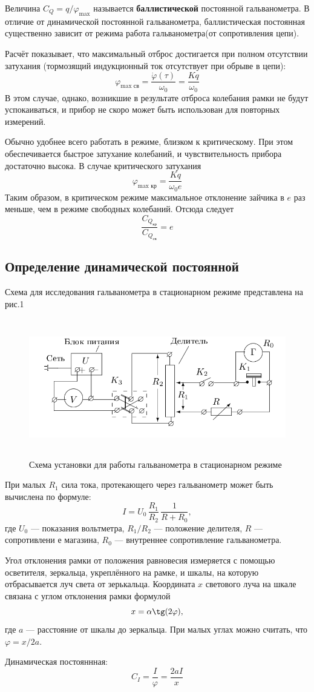 \documentclass[12pt]{article}
\begin{document}
\par
	Величина $C_Q = q / \varphi_\text{max}$ называется {\bf баллистической} постоянной гальванометра. В отличие от динамической постоянной гальванометра, баллистическая постоянная существенно зависит от режима работа гальванометра(от сопротивления цепи).
\par
	Расчёт показывает, что максимальный отброс достигается при полном отсутствии затухания (тормозящий индукционный ток отсутствует при обрыве в цепи):
\[
	\varphi_\text{max св} = \frac{\dot \varphi(\tau)}{\omega_0} = \frac{Kq}{\omega_0}
\]
В этом случае, однако, возникшие в результате отброса колебания рамки не будут успокаиваться, и прибор не скоро может быть использован для повторных измерений.		
\par
	Обычно удобнее всего работать в режиме, близком к критическому. При этом обеспечивается быстрое затухание колебаний, и чувствительность прибора достаточно высока. В случае критического затухания
\[
	\varphi_\text{max кр} = \frac{Kq}{\omega_0 e}
\]		
Таким образом, в критическом режиме максимальное отклонение зайчика в $e$ раз меньше, чем в режиме свободных колебаний. Отсюда следует
\[
	\frac{C_\text{$Q_\text{кр}$}}{C_\text{$Q_\text{св}$}} = e
\]
\subsection*{Определение динамической постоянной}
\par
	Схема для исследования гальванометра в стационарном режиме представлена на рис.1
\begin{figure}[h!]
	\centering
	\includegraphics[width = 15cm, height = 6cm]{image1.png}
	\caption{Схема установки для работы гальванометра в стационарном режиме}
\end{figure}
\par			
При малых $R_1$ сила тока, протекающего через гальванометр может быть вычислена по формуле:
\[
	I = U_0\, \frac{R_1}{R_2}\, \frac{1}{R + R_0},
\]	
где $U_0$ --- показания вольтметра, $R_1 / R_2$ --- положение делителя, $R$ --- сопротивлени е магазина, $R_0$ --- внутреннее сопротивление гальванометра.
\par
	Угол отклонения рамки от положения равновесия измеряется с помощью осветителя, зеркальца, укреплённого на рамке, и шкалы, на которую отбрасывается луч света от зерькальца. Координата $x$ светового луча на шкале связана с углом отклонения рамки формулой
\[
	x = \alpha \tg(2\varphi),
\]	 
где $a$ --- расстояние от шкалы до зеркальца. При малых углах можно считать, что $\varphi = x / 2a$.
\par
Динамическая постояннная:
\[
	C_I = \frac{I}{\varphi} = \frac{2aI}{x}
\]
\end{document}
